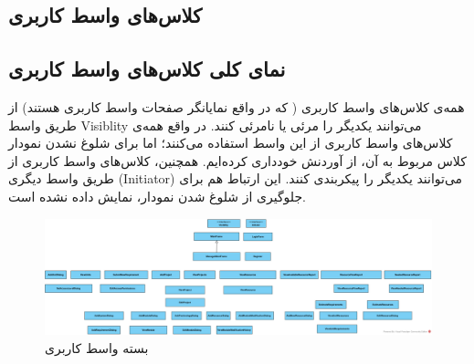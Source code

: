 \begin{landscape}
\section{کلاس‌های واسط کاربری}
\subsection{نمای کلی کلاس‌های واسط کاربری}
همه‌ی کلاس‌های واسط کاربری ( که در واقع نمایانگر صفحات واسط کاربری هستند) از طریق واسط Visiblity می‌توانند یکدیگر را مرئی یا نامرئی کنند. در واقع همه‌ی کلاس‌های واسط کاربری از این واسط استفاده می‌کنند؛ اما برای شلوغ نشدن نمودار کلاس مربوط به آن، از آوردنش خودداری کرده‌ایم. همچنین، کلاس‌های واسط کاربری از طریق واسط دیگری (Initiator) می‌توانند یکدیگر را پیکربندی کنند. این ارتباط هم برای جلوگیری از شلوغ شدن نمودار، نمایش داده نشده است.\\
\begin{figure}[H]
	\centering
	\includegraphics[scale=0.4]{img/class-design/ui/UI}
	\caption{بسته واسط کاربری}
\end{figure}
\end{landscape}

